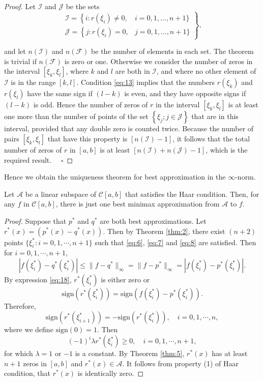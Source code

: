 \documentclass[11pt]{article}
\begin{document}
\begin{proof}
Let $\mathscr{I}$ and $\mathscr{J}$ be the sets
\begin{equation}
\left.\begin{array}{ll}
\mathscr{I}=\left\{i: r\left(\xi_{i}\right) \neq 0,\right. & i=0,1, \ldots, n+1\}  \\
\mathscr{J}=\left\{j: r\left(\xi_{i}\right)=0,\right. & j=0,1, \ldots, n+1\}
\end{array}\right\},
\label{eq:14}
\end{equation}

and let $n(\mathscr{I})$ and $n(\mathscr{F})$ be the number of elements in each set. The theorem is trivial if $n(\mathscr{F})$ is zero or one. Otherwise we consider the number of zeros in the interval $\left[\xi_{k}, \xi_{l}\right]$, where $k$ and $l$ are both in $\mathscr{I}$, and where no other element of $\mathscr{I}$ is in the range $[k, l]$. Condition \eqref{eq:13} implies that the numbers $r\left(\xi_{k}\right)$ and $r\left(\xi_{l}\right)$ have the same sign if $(l-k)$ is even, and they have opposite signs if $(l-k)$ is odd. Hence the number of zeros of $r$ in the interval $\left[\xi_{k}, \xi_{l}\right]$ is at least one more than the number of points of the set $\left\{\xi_{j} ; j \in \mathscr{J}\right\}$ that are in this interval, provided that any double zero is counted twice. Because the number of pairs $\left[\xi_{k}, \xi_{l}\right]$ that have this property is $[n(\mathscr{I})-1]$, it follows that the total number of zeros of $r$ in $[a, b]$ is at least $[n(\mathscr{I})+n(\mathscr{J})-1]$, which is the required result. $\quad \square$
\end{proof}

Hence we obtain the uniqueness theorem for best approximation in the $\infty$-norm.

\begin{theorem} \label{thm:6}
Let $\mathscr{A}$ be a linear subspace of $\mathscr{C}[a, b]$ that satisfies the Haar condition. Then, for any $f$ in $\mathscr{C}[a, b]$, there is just one best minimax approximation from $\mathscr{A}$ to $f$.
\end{theorem}
\begin{proof}
Suppose that $p^{*}$ and $q^{*}$ are both best approximations. Let $r^*(x) = \left(p^{*}(x)-q^{*}(x) \right)$. Then by Theorem \ref{thm:2}, there exist $(n+2)$ points $\{\xi_i^*: i = 0,1,\cdots,n+1\}$ such that \eqref{eq:6}, \eqref{eq:7} and \eqref{eq:8} are satisfied. Then for $i=0,1,\cdots,n+1$,
\[
| f(\xi_i^*) - q^*(\xi_i^*) | \leqslant \|f-q^*\|_\infty = \|f-p^*\|_\infty = |f(\xi_i^*) - p^*(\xi_i^*)|.
\]
By expression \eqref{eq:18}, $r^*(\xi_i^*)$ is either zero or
\[
\mathrm{sign}(r^*(\xi_i^*)) = \mathrm{sign}(f(\xi_i^*) - p^*(\xi_i^*)).
\]
Therefore, 
\[
\mathrm{sign}(r^*(\xi_{i+1}^*)) = -\mathrm{sign}(r^*(\xi_i^*)),\quad i=0,1,\cdots,n,
\]
where we define $\mathrm{sign}(0)=1$. Then 
\[
(-1)^i \lambda r^*(\xi_i^*) \geqslant 0,\quad i=0,1,\cdots,n+1,
\]
for which $\lambda=1$ or $-1$ is a constant. By Theorem \ref{thm:5}, $r^*(x)$ has at least $n+1$ zeros in $[a,b]$ and $r^*(x)\in\mathscr{A}$. It follows from property (1) of Haar condition, that $r^*(x)$ is identically zero.
\end{proof}
\end{document}
